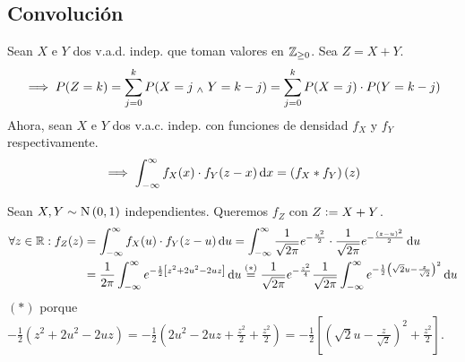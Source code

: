 

\subsection{Convolución}

Sean $X$ e $Y$ dos v.a.d. indep. que toman valores en $\mathbb{Z}_{\geq 0}$. Sea $Z = X + Y$.
\[\implies P(Z = k) = \sum_{j=0}^{k} P(X = j \; _{\wedge} \; Y = k-j) = \sum_{j=0}^{k} P(X = j) \cdot P(Y = k-j)\]
Ahora, sean $X$ e $Y$ dos v.a.c. indep. con funciones de densidad $f_X$ y $f_Y$ respectivamente.
\[\implies \int_{-\infty}^{\infty} f_{X}(x) \cdot f_{Y}(z-x) \odif{x} = \left(f_{X} * f_{Y}\right) (z)\] %

\begin{ejem}
	Sean $X, Y \sim \operatorname{N}\left(0, 1\right)$ independientes. Queremos $f_Z$ con $Z \vcentcolon= X + Y$.
	\[\begin{aligned}
			\forall z \in \R : f_Z(z) & = \int_{-\infty}^{\infty} f_X(u) \cdot f_Y(z-u) \odif{u} = \int_{-\infty}^{\infty} \frac{1}{\sqrt{2\pi}} e^{-\frac{u^2}{2}} \cdot \frac{1}{\sqrt{2\pi}} e^{-\frac{(z-u)^2}{2}} \odif{u}                                                                                         \\
			                          & = \frac{1}{2\pi} \int_{-\infty}^{\infty} e^{-\frac{1}{2}\left[z^2 + 2u^2 - 2uz\right]} \odif{u} \stackrel{(*)}{=} \frac{1}{\sqrt{2\pi}} e^{-\frac{z^2}{4}} \frac{1}{\sqrt{2\pi}} \int_{-\infty}^{\infty} e^{-\frac{1}{2}\left(\sqrt{2}u - \frac{z}{\sqrt{2}}\right)^2} \odif{u} \\
		\end{aligned}\]
	$(*)$ porque $-\frac{1}{2}(z^2 + 2u^2 - 2uz) = -\frac{1}{2}\left(2u^2 - 2uz +\frac{z^2}{2} + \frac{z^2}{2}\right) = -\frac{1}{2}\left[\left(\sqrt{2}u - \frac{z}{\sqrt{2}}\right)^2 + \frac{z^2}{2}\right]$.


\end{ejem}

